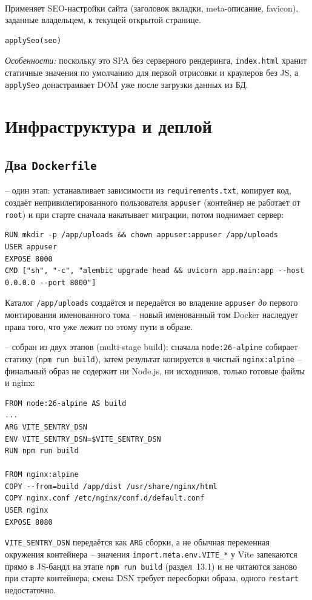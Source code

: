 \paragraph{}
Применяет SEO-настройки сайта (заголовок вкладки, meta-описание,
favicon), заданные владельцем, к текущей открытой странице.
\begin{verbatim}
applySeo(seo)
\end{verbatim}
\textit{Особенности:} поскольку это SPA без серверного рендеринга,
\texttt{index.html} хранит статичные значения по умолчанию для первой
отрисовки и краулеров без JS, а \texttt{applySeo} донастраивает DOM уже
после загрузки данных из БД.

\section{Инфраструктура и деплой}

\subsection{Два \texttt{Dockerfile}}

 -- один этап: устанавливает зависимости из
\texttt{requirements.txt}, копирует код, создаёт непривилегированного
пользователя \texttt{appuser} (контейнер не работает от \texttt{root}) и
при старте сначала накатывает миграции, потом поднимает сервер:
\begin{verbatim}
RUN mkdir -p /app/uploads && chown appuser:appuser /app/uploads
USER appuser
EXPOSE 8000
CMD ["sh", "-c", "alembic upgrade head && uvicorn app.main:app --host 0.0.0.0 --port 8000"]
\end{verbatim}
Каталог \texttt{/app/uploads} создаётся и передаётся во владение
\texttt{appuser} \emph{до} первого монтирования именованного тома --
новый именованный том Docker наследует права того, что уже лежит по
этому пути в образе.

 -- собран из двух этапов
(multi-stage build): сначала \texttt{node:26-alpine} собирает статику
(\texttt{npm run build}), затем результат копируется в чистый
\texttt{nginx:alpine} -- финальный образ не содержит ни Node.js, ни
исходников, только готовые файлы и nginx:
\begin{verbatim}
FROM node:26-alpine AS build
...
ARG VITE_SENTRY_DSN
ENV VITE_SENTRY_DSN=$VITE_SENTRY_DSN
RUN npm run build

FROM nginx:alpine
COPY --from=build /app/dist /usr/share/nginx/html
COPY nginx.conf /etc/nginx/conf.d/default.conf
USER nginx
EXPOSE 8080
\end{verbatim}
\texttt{VITE_SENTRY_DSN} передаётся как \texttt{ARG} сборки, а не
обычная переменная окружения контейнера -- значения
\texttt{import.meta.env.VITE_*} у Vite запекаются прямо в JS-бандл на
этапе \texttt{npm run build} (раздел~13.1) и не читаются заново при
старте контейнера; смена DSN требует пересборки образа, одного
\texttt{restart} недостаточно.

